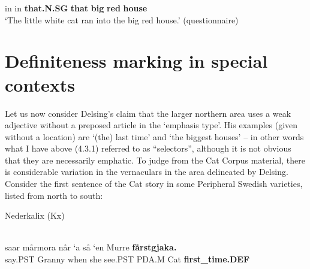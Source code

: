 in  in  \textbf{that.N.SG} \textbf{that} \textbf{big} \textbf{red} \textbf{house} \\

\glt  ‘The little white cat ran into the big red house.’ (questionnaire)

\z

\section{Definiteness marking in special contexts}

Let us now consider Delsing’s claim that the larger northern area uses a weak adjective without a preposed article in the ‘emphasis type’. His examples (given without a location) are  ‘(the) last time’ and  ‘the biggest houses’ – in other words what I have above (4.3.1) referred to as “selectors”, although it is not obvious that they are necessarily emphatic. To judge from the Cat Corpus material, there is considerable variation in the vernaculars in the area delineated by Delsing. Consider the first sentence of the Cat story in some Peripheral Swedish varieties, listed from north to south:


\item 


\item 

Nederkalix (Kx)



 \ea\label{}
\\

 \ea\label{}
\gll saar  mårmora  når  ‘a  så  ‘en  Murre  \textbf{fårstgjaka.}\\


say.PST  Granny  when  she  see.PST  PDA.M  Cat  \textbf{first\_time.DEF}\\

